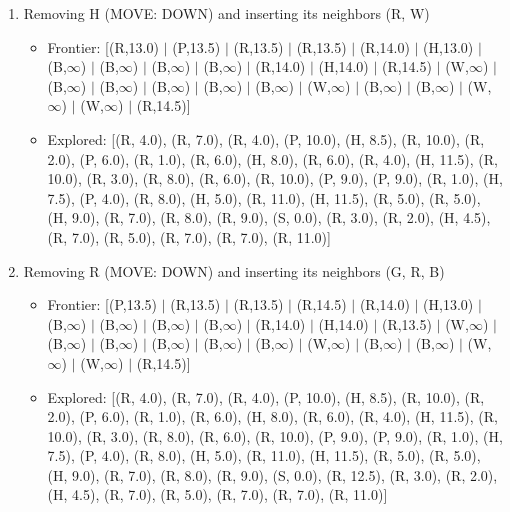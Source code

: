 \documentclass[12pt]{article}
\begin{document}
\begin{enumerate}
\item Removing H (MOVE: DOWN) and inserting its neighbors (R, W)
\begin{itemize}
\item Frontier: [(R,13.0) \(|\) (P,13.5) \(|\) (R,13.5) \(|\) (R,13.5) \(|\) (R,14.0) \(|\) (H,13.0) \(|\) (B,\(\infty\)) \(|\) (B,\(\infty\)) \(|\) (B,\(\infty\)) \(|\) (B,\(\infty\)) \(|\) (R,14.0) \(|\) (H,14.0) \(|\) (R,14.5) \(|\) (W,\(\infty\)) \(|\) (B,\(\infty\)) \(|\) (B,\(\infty\)) \(|\) (B,\(\infty\)) \(|\) (B,\(\infty\)) \(|\) (B,\(\infty\)) \(|\) (W,\(\infty\)) \(|\) (B,\(\infty\)) \(|\) (B,\(\infty\)) \(|\) (W,\(\infty\)) \(|\) (W,\(\infty\)) \(|\) (R,14.5)]
\item Explored: [(R, 4.0), (R, 7.0), (R, 4.0), (P, 10.0), (H, 8.5), (R, 10.0), (R, 2.0), (P, 6.0), (R, 1.0), (R, 6.0), (H, 8.0), (R, 6.0), (R, 4.0), (H, 11.5), (R, 10.0), (R, 3.0), (R, 8.0), (R, 6.0), (R, 10.0), (P, 9.0), (P, 9.0), (R, 1.0), (H, 7.5), (P, 4.0), (R, 8.0), (H, 5.0), (R, 11.0), (H, 11.5), (R, 5.0), (R, 5.0), (H, 9.0), (R, 7.0), (R, 8.0), (R, 9.0), (S, 0.0), (R, 3.0), (R, 2.0), (H, 4.5), (R, 7.0), (R, 5.0), (R, 7.0), (R, 7.0), (R, 11.0)]
\end{itemize}

\item Removing R (MOVE: DOWN) and inserting its neighbors (G, R, B)
\begin{itemize}
\item Frontier: [(P,13.5) \(|\) (R,13.5) \(|\) (R,13.5) \(|\) (R,14.5) \(|\) (R,14.0) \(|\) (H,13.0) \(|\) (B,\(\infty\)) \(|\) (B,\(\infty\)) \(|\) (B,\(\infty\)) \(|\) (B,\(\infty\)) \(|\) (R,14.0) \(|\) (H,14.0) \(|\) (R,13.5) \(|\) (W,\(\infty\)) \(|\) (B,\(\infty\)) \(|\) (B,\(\infty\)) \(|\) (B,\(\infty\)) \(|\) (B,\(\infty\)) \(|\) (B,\(\infty\)) \(|\) (W,\(\infty\)) \(|\) (B,\(\infty\)) \(|\) (B,\(\infty\)) \(|\) (W,\(\infty\)) \(|\) (W,\(\infty\)) \(|\) (R,14.5)]
\item Explored: [(R, 4.0), (R, 7.0), (R, 4.0), (P, 10.0), (H, 8.5), (R, 10.0), (R, 2.0), (P, 6.0), (R, 1.0), (R, 6.0), (H, 8.0), (R, 6.0), (R, 4.0), (H, 11.5), (R, 10.0), (R, 3.0), (R, 8.0), (R, 6.0), (R, 10.0), (P, 9.0), (P, 9.0), (R, 1.0), (H, 7.5), (P, 4.0), (R, 8.0), (H, 5.0), (R, 11.0), (H, 11.5), (R, 5.0), (R, 5.0), (H, 9.0), (R, 7.0), (R, 8.0), (R, 9.0), (S, 0.0), (R, 12.5), (R, 3.0), (R, 2.0), (H, 4.5), (R, 7.0), (R, 5.0), (R, 7.0), (R, 7.0), (R, 11.0)]
\end{itemize}


\end{enumerate}
\end{document}
